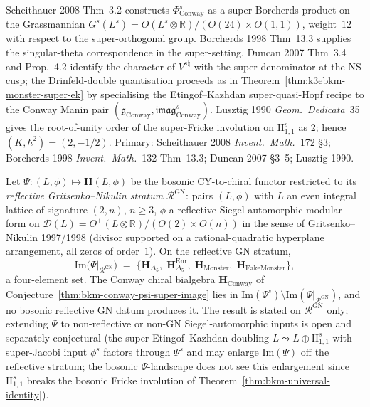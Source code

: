 \begin{remark}
Scheithauer 2008 Thm~3.2 constructs $\Phi^{s}_{\mathrm{Conway}}$ as
a super-Borcherds product on the Grassmannian
$G^{s}(L^{s}) = O(L^{s}\otimes\mathbb{R})/(O(24)\times O(1,1))$,
weight~$12$ with respect to the super-orthogonal group. Borcherds
1998 Thm~13.3 supplies the singular-theta correspondence in the
super-setting. Duncan 2007 Thm~3.4 and Prop.~4.2 identify the
character of $V^{s\natural}$ with the super-denominator at the NS
cusp; the Drinfeld-double quantisation proceeds as in
Theorem~\ref{thm:k3ebkm-monster-super-ek} by specialising the
Etingof--Kazhdan super-quasi-Hopf recipe to the Conway Manin pair
$(\mathfrak{g}_{\mathrm{Conway}},
\mathfrak{imag}^{s}_{\mathrm{Conway}})$. Lusztig 1990
\emph{Geom.\ Dedicata}~35 gives the root-of-unity order of the
super-Fricke involution on $\mathrm{II}_{1,1}^{s}$ as $2$;
hence $(K,\hbar^2) = (2,-1/2)$. Primary: Scheithauer 2008
\emph{Invent.\ Math.}~172 \S3; Borcherds 1998
\emph{Invent.\ Math.}~132 Thm~13.3; Duncan 2007 \S3--5;
Lusztig 1990.
\end{remark}

\begin{theorem}
\label{thm:bkm-psi-four-is-all}
Let $\Psi\colon(L,\phi)\mapsto\mathbf{H}(L,\phi)$ be the bosonic
CY-to-chiral functor restricted to its \emph{reflective
Gritsenko--Nikulin stratum} $\mathcal R^{\mathrm{GN}}$: pairs
$(L,\phi)$ with $L$ an even integral lattice of signature $(2,n)$,
$n\ge 3$, $\phi$ a reflective Siegel-automorphic modular form on
$\mathcal D(L) = O^+(L\otimes\mathbb R)/(O(2)\times O(n))$ in the
sense of Gritsenko--Nikulin 1997/1998 (divisor supported on a
rational-quadratic hyperplane arrangement, all zeros of order~$1$).
On the reflective GN stratum,
\[
 \mathrm{Im}\bigl(\Psi|_{\mathcal R^{\mathrm{GN}}}\bigr)
 \;=\;
 \bigl\{
 \mathbf{H}_{\Delta_5},\;
 \mathbf{H}_{\Delta_5}^{\mathrm{Enr}},\;
 \mathbf{H}_{\mathrm{Monster}},\;
 \mathbf{H}_{\mathrm{FakeMonster}}
 \bigr\},
\]
a four-element set. The Conway chiral bialgebra
$\mathbf{H}_{\mathrm{Conway}}$ of
Conjecture~\ref{thm:bkm-conway-psi-super-image}
lies in $\mathrm{Im}(\Psi^{s})\setminus
\mathrm{Im}(\Psi|_{\mathcal R^{\mathrm{GN}}})$, and no bosonic
reflective GN datum produces it. The result is stated on
$\mathcal R^{\mathrm{GN}}$ only; extending \(\Psi\) to
non-reflective or non-GN Siegel-automorphic inputs is open and
separately conjectural (the super-Etingof--Kazhdan doubling
$L \leadsto L \oplus \mathrm{II}_{1,1}^{s}$ with super-Jacobi
input $\phi^{s}$ factors through $\Psi^{s}$ and may enlarge
$\mathrm{Im}(\Psi)$ off the reflective stratum; the bosonic
$\Psi$-landscape does not see this enlargement since
$\mathrm{II}_{1,1}^{s}$ breaks the bosonic Fricke involution of
Theorem~\ref{thm:bkm-universal-identity}).
\end{theorem}

